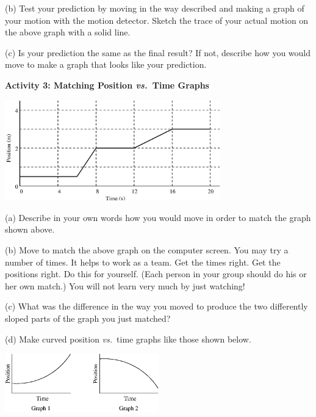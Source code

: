 (b) Test your prediction by moving in the way described and making a graph of
your motion with the motion detector. Sketch the trace of your actual motion
on the above graph with a solid line. 

(c) Is your prediction the same as the final result? If not, describe how you
would move to make a graph that looks like your prediction.
\answerspace{20mm}

\pagebreak[2]
\textbf{Activity 3: Matching Position \textit{vs.}~Time Graphs}

{\par\centering \includegraphics[width=0.7\textwidth]{position/position_fig3.eps} \par}
\vspace{-0.1cm}

(a) Describe in your own words how you would move in order to match the graph
shown above.
\answerspace{15mm}

(b) Move to match the above graph on the computer screen. You may try a number
of times. It helps to work as a team. Get the times right. Get the positions
right. Do this for yourself. (Each person in your group should do his or her
own match.) You will not learn very much by just watching!

(c) What was the difference in the way you moved to produce the two differently
sloped parts of the graph you just matched?
\answerspace{15mm}

(d) Make curved position \textit{vs.}~time graphs like those shown below.

\vspace{0.3cm}
{\par\centering \includegraphics[width=0.5\textwidth]{position/position_fig4.eps} \par}
\vspace{-0.1cm}

